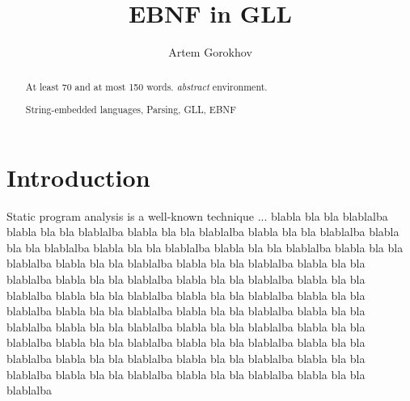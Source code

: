 \documentclass[runningheads,a4paper]{llncs}
\newcommand{\keywords}[1]{\par\addvspace\baselineskip
\noindent\keywordname\enspace\ignorespaces#1}
\begin{document}
\mainmatter  %

\title{EBNF in GLL}


\author{Artem Gorokhov}


\maketitle


\begin{abstract}
At least 70 and at most 150 words.
\emph{abstract} environment.
\keywords{String-embedded languages, Parsing, GLL, EBNF }
\end{abstract}


\section{Introduction}%

Static program analysis is a well-known technique ...
blabla bla bla blablalba blabla bla bla blablalba blabla bla bla blablalba blabla bla bla blablalba 
blabla bla bla blablalba blabla bla bla blablalba blabla bla bla blablalba blabla bla bla blablalba 
blabla bla bla blablalba blabla bla bla blablalba blabla bla bla blablalba blabla bla bla blablalba 
blabla bla bla blablalba blabla bla bla blablalba blabla bla bla blablalba blabla bla bla blablalba 
blabla bla bla blablalba blabla bla bla blablalba blabla bla bla blablalba blabla bla bla blablalba 
blabla bla bla blablalba blabla bla bla blablalba blabla bla bla blablalba blabla bla bla blablalba 
blabla bla bla blablalba blabla bla bla blablalba blabla bla bla blablalba blabla bla bla blablalba 
blabla bla bla blablalba blabla bla bla blablalba blabla bla bla blablalba blabla bla bla blablalba 
\end{document}
